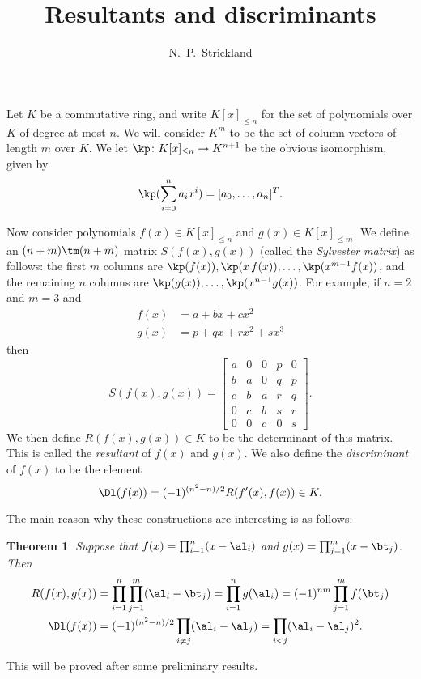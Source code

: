 \documentclass{amsart}
\renewcommand{\:}{\colon}
\newtheorem{theorem}{Theorem}[section]
\theoremstyle{definition}
\begin{document}
\title{Resultants and discriminants}
\author{N.~P.~Strickland}

\maketitle 

Let $K$ be a commutative ring, and write $K[x]_{\leq n}$ for the set
of polynomials over $K$ of degree at most $n$.  We will consider $K^m$
to be the set of column vectors of length $m$ over $K$.  We let 
$\kp\:K[x]_{\leq n}\to K^{n+1}$ be the obvious isomorphism, given by 
\[ \kp(\sum_{i=0}^na_ix^i) = [a_0,\dotsc,a_n]^T. \]

Now consider polynomials $f(x)\in K[x]_{\leq n}$ and 
$g(x)\in K[x]_{\leq m}$.  We define an $(n+m)\tm(n+m)$ matrix
$S(f(x),g(x))$ (called the \emph{Sylvester matrix}) as follows: the
first $m$ columns are
$\kp(f(x)),\kp(x\,f(x)),\dotsc,\kp(x^{m-1}f(x))$, and the remaining
$n$ columns are $\kp(g(x)),\dotsc,\kp(x^{n-1}g(x))$.  For example, if
$n=2$ and $m=3$ and
\begin{align*}
 f(x) &= a+bx+cx^2 \\
 g(x) &= p+qx+rx^2+sx^3 
\end{align*}
then
\[ S(f(x),g(x)) =
   \left[\begin{array}{ccc|cc}
    a & 0 & 0 & p & 0 \\
    b & a & 0 & q & p \\
    c & b & a & r & q \\
    0 & c & b & s & r \\
    0 & 0 & c & 0 & s
   \end{array}\right].
\]
We then define $R(f(x),g(x))\in K$ to be the determinant of this
matrix.  This is called the \emph{resultant} of $f(x)$ and $g(x)$.  We
also define the \emph{discriminant} of $f(x)$ to be the element
\[ \Dl(f(x)) = (-1)^{(n^2-n)/2} R(f'(x),f(x)) \in K. \]

The main reason why these constructions are interesting is as follows:
\begin{theorem}\label{thm-resultant}
 Suppose that $f(x)=\prod_{i=1}^n(x-\al_i)$ and
 $g(x)=\prod_{j=1}^m(x-\bt_j)$.  Then 
 \begin{align*}
  R(f(x),g(x)) &=
   \prod_{i=1}^n\prod_{j=1}^m(\al_i-\bt_j) = 
   \prod_{i=1}^ng(\al_i) = (-1)^{nm}\prod_{j=1}^m f(\bt_j) \\
  \Dl(f(x)) &= (-1)^{(n^2-n)/2}\prod_{i\neq j}(\al_i-\al_j)
    = \prod_{i<j}(\al_i-\al_j)^2.
 \end{align*}
\end{theorem}

This will be proved after some preliminary results.



\begin{bibdiv}
\begin{biblist}
\end{biblist}
\end{bibdiv}
\end{document}
